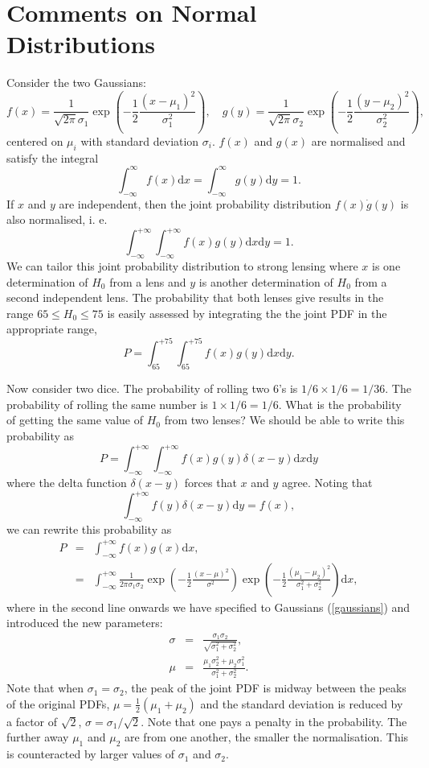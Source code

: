 \documentclass[aps,prl,10pt,twocolumn,superscriptaddress]{revtex4}
\def\be{\begin{equation}}
\def\ee{\end{equation}}
\def\bea{\begin{eqnarray}}
\def\eea{\end{eqnarray}}
\newcommand{\dd}{\textrm{d}}
\newcommand{\nn}{\nonumber \\}
\begin{document}
\section{Comments on Normal Distributions}
Consider the two Gaussians:
\be
\label{gaussians}
f(x) = \frac{1}{\sqrt{2 \pi} \sigma_1} \exp \left( -\frac{1}{2} \frac{(x - \mu_1)^2}{\sigma_1^2} \right), \quad g(y) = \frac{1}{\sqrt{2 \pi} \sigma_2} \exp \left( -\frac{1}{2} \frac{(y - \mu_2)^2}{\sigma_2^2} \right),  
\ee
centered on $\mu_i$ with standard deviation $\sigma_i$. 
$f(x)$ and $g(x)$ are normalised and satisfy the integral
\be
\int_{-\infty}^{\infty} f(x) \dd x = \int_{-\infty}^{\infty} g(y) \dd y =  1. 
\ee
If $x$ and $y$ are independent, then the joint probability distribution $f(x) \dot g(y)$ is also normalised, i. e. 
\be
\int_{-\infty}^{+\infty} \int_{-\infty}^{+\infty} f(x) g(y) \dd x \dd y = 1. 
\ee
We can tailor this joint probability distribution to strong lensing where $x$ is one determination of $H_0$ from a lens and $y$ is another determination of $H_0$ from a second independent lens. The probability that both lenses give results in the range $65 \leq H_0 \leq 75$ is easily assessed by integrating the the joint PDF in the appropriate range, 
\be
P = \int_{65}^{+75} \int_{65}^{+75} f(x) g(y) \dd x \dd y. 
\ee



Now consider two dice. The probability of rolling two 6's is $1/6 \times 1/6 = 1/36$. The probability of rolling the same number is $1 \times 1/6 = 1/6$. What is the probability of getting the same value of $H_0$ from two lenses? We should be able to write this probability as 
\be
P = \int_{-\infty}^{+\infty} \int_{-\infty}^{+\infty} f(x) g(y) \delta (x-y) \dd x \dd y
\ee
where the delta function $\delta(x-y)$ forces that $x$ and $y$ agree. Noting that
\be
\int_{-\infty}^{+\infty} f(y) \delta (x-y) \dd y  = f(x), 
\ee
we can rewrite this probability as 
\bea
\label{product}
P &=& \int_{-\infty}^{+\infty} f(x) g(x) \dd x,  \nn
&=& \int_{-\infty}^{+\infty} \frac{1}{2 \pi \sigma_1 \sigma_2 } \exp \left( -\frac{1}{2} \frac{(x- \mu)^2}{\sigma^2} \right) \exp \left( - \frac{1}{2} \frac{(\mu_1-\mu_2)^2}{\sigma_1^2 + \sigma_2^2} \right) \dd x, 
\eea
where in the second line onwards we have specified to Gaussians (\ref{gaussians}) and introduced the new parameters: 
\bea
\sigma &=& \frac{\sigma_1 \sigma_2}{\sqrt{\sigma_1^2+\sigma_2^2}}, \nn
\mu &=& \frac{\mu_1 \sigma_2^2 + \mu_2 \sigma_1^2}{\sigma_1^2 + \sigma_2^2}. 
\eea
Note that when $\sigma_1 = \sigma_2$, the peak of the joint PDF is midway between the peaks of the original PDFs, $\mu = \frac{1}{2} (\mu_1 + \mu_2)$ and the standard deviation is reduced by a factor of $\sqrt{2}$, $\sigma = \sigma_1/\sqrt{2}$. Note that one pays a penalty in the probability. The further away $\mu_1$ and $\mu_2$ are from one another, the smaller the normalisation. This is counteracted by larger values of $\sigma_1$ and $\sigma_2$.   
\end{document}
